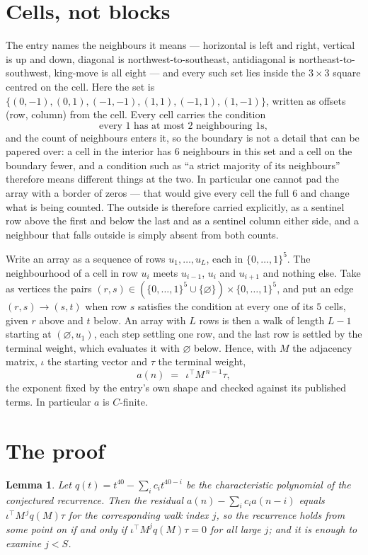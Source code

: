 \documentclass[11pt,a4paper]{article}
\theoremstyle{plain}
\newtheorem{lemma}[theorem]{Lemma}
\theoremstyle{definition}
\begin{document}
\section{Cells, not blocks}

The entry names the neighbours it means --- horizontal is left and right, vertical is up and
down, diagonal is northwest-to-southeast, antidiagonal is northeast-to-southwest, king-move is
all eight --- and every such set lies inside the $3\times3$ square centred on the cell. Here
the set is $\{(0,-1), (0,1), (-1,-1), (1,1), (-1,1), (1,-1)\}$, written as offsets (row, column) from the cell. Every cell carries
the condition
\[
\text{every 1 has at most 2 neighbouring 1s},
\]
and the count of neighbours enters it, so the boundary is not a detail that can be papered
over: a cell in the interior has $6$ neighbours in this set and a cell on the boundary
fewer, and a condition such as ``a strict majority of its neighbours'' therefore means
different things at the two. In particular one cannot pad the array with a border of zeros ---
that would give every cell the full $6$ and change what is being counted. The outside is
therefore carried
explicitly, as a sentinel row above the first and below the last and as a sentinel column
either side, and a neighbour that falls outside is simply absent from both counts.

Write an array as a sequence of rows $u_1,\dots,u_L$, each in
$\{0,\dots,1\}^{5}$. The neighbourhood of a cell in row $u_i$ meets $u_{i-1}$,
$u_i$ and $u_{i+1}$ and nothing else. Take as vertices the pairs
$(r,s)\in(\{0,\dots,1\}^{5}\cup\{\varnothing\})\times\{0,\dots,1\}^{5}$,
and put an edge $(r,s)\to(s,t)$ when row $s$ satisfies the condition at every one of its
$5$ cells, given $r$ above and $t$ below. An array with $L$ rows is then a walk of length
$L-1$ starting at $(\varnothing,u_1)$, each step settling one row, and the last row is
settled by the terminal weight, which evaluates it with $\varnothing$ below. Hence,
with $M$ the adjacency matrix, $\iota$ the starting vector and $\tau$ the terminal weight,
\[
a(n)\;=\;\,\iota^{\!\top}M^{\,n-1}\tau ,
\]
the exponent fixed by the entry's own shape and checked against its published terms. In
particular $a$ is $C$-finite.

\section{The proof}

\begin{lemma}\label{lem:crit}
Let $q(t)=t^{40}-\sum_i c_it^{40-i}$ be the characteristic polynomial of the
conjectured recurrence. Then the residual $a(n)-\sum_ic_ia(n-i)$ equals
$\iota^{\!\top}M^{\,j}q(M)\tau$ for the corresponding walk index $j$, so the
recurrence holds from some point on if and only if $\iota^{\!\top}M^{j}q(M)\tau=0$ for all
large $j$; and it is enough to examine $j<S$.
\end{lemma}
\end{document}
